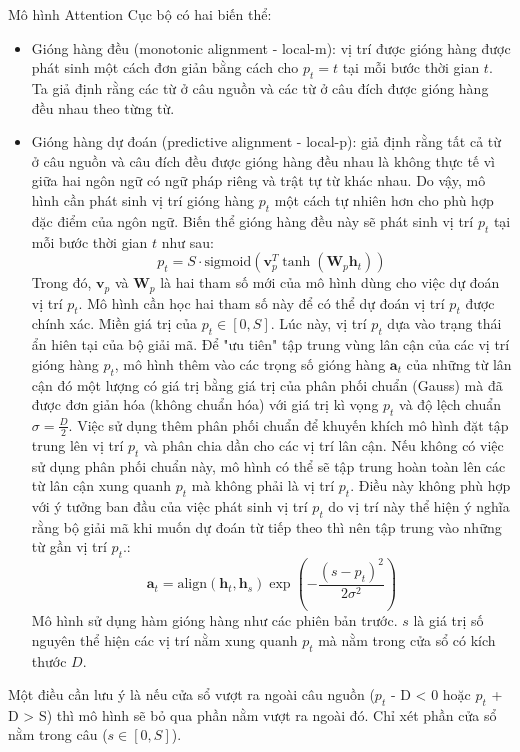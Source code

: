 Mô hình Attention Cục bộ có hai biến thể:
\begin{itemize}
	\item Gióng hàng đều (monotonic alignment - local-m): vị trí được gióng hàng được phát sinh một cách đơn giản bằng cách cho $p_t = t$ tại mỗi bước thời gian $t$. Ta giả định rằng các từ ở câu nguồn và các từ ở câu đích được gióng hàng đều nhau theo từng từ.
	\item Gióng hàng dự đoán (predictive alignment - local-p): giả định rằng tất cả từ ở câu nguồn và câu đích đều được gióng hàng đều nhau là không thực tế vì giữa hai ngôn ngữ có ngữ pháp riêng và trật tự từ khác nhau. Do vậy, mô hình cần phát sinh vị trí gióng hàng $p_t$ một cách tự nhiên hơn cho phù hợp đặc điểm của ngôn ngữ. Biến thể gióng hàng đều này sẽ phát sinh vị trí $p_t$ tại mỗi bước thời gian $t$ như sau:
	\begin{equation}
	p_t = S \cdot \text{sigmoid} (\bm{v}^T_p \tanh(\bm{W}_p \bm{h}_t))
	\end{equation}
	Trong đó, $\bm{v}_p$ và $\bm{W}_p$ là hai tham số mới của mô hình dùng cho việc dự đoán vị trí $p_t$. Mô hình cần học hai tham số này để có thể dự đoán vị trí $p_t$ được chính xác. Miền giá trị của $p_t \in [0, S]$. Lúc này, vị trí $p_t$ dựa vào trạng thái ẩn hiên tại của bộ giải mã.
	Để "ưu tiên" tập trung vùng lân cận của các vị trí gióng hàng $p_t$, mô hình thêm vào các trọng số gióng hàng $\bm{a}_t$ của những từ lân cận đó một lượng có giá trị bằng giá trị của phân phối chuẩn (Gauss) mà đã được đơn giản hóa (không chuẩn hóa) với giá trị kì vọng $p_t$ và độ lệch chuẩn $\sigma = \frac{D}{2}$. Việc sử dụng thêm phân phối chuẩn để khuyến khích mô hình đặt tập trung lên vị trí $p_t$ và phân chia dần cho các vị trí lân cận. Nếu không có việc sử dụng phân phối chuẩn này, mô hình có thể sẽ tập trung hoàn toàn lên các từ lân cận xung quanh $p_t$ mà không phải là vị trí $p_t$. Điều này không phù hợp với ý tưởng ban đầu của việc phát sinh vị trí $p_t$ do vị trí này thể hiện ý nghĩa rằng bộ giải mã khi muốn dự đoán từ tiếp theo thì nên tập trung vào những từ gần vị trí $p_t$.:
	\begin{equation}
	\bm{a}_t = \text{align}(\bm{h}_t, \bm{h}_s)\exp\left(-\frac{(s-p_t)^2}{2\sigma^2}\right)
	\end{equation}
	Mô hình sử dụng hàm gióng hàng như các phiên bản trước. $s$ là giá trị số nguyên thể hiện các vị trí nằm xung quanh $p_t$ mà nằm trong cửa sổ có kích thước $D$.
\end{itemize}

Một điều cần lưu ý là nếu cửa sổ vượt ra ngoài câu nguồn ($p_t$ - D < 0 hoặc $p_t$ + D > S) thì mô hình sẽ bỏ qua phần nằm vượt ra ngoài đó. Chỉ xét phần cửa sổ nằm trong câu ($s \in [0, S]$).
 
